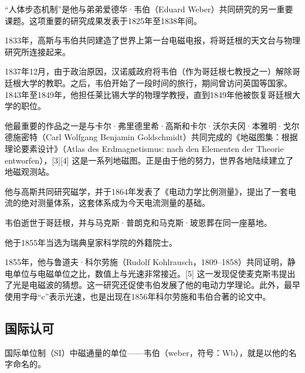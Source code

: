 “人体步态机制”是他与弟弟爱德华·韦伯（Eduard Weber）共同研究的另一重要课题。这项重要的研究成果发表于1825年至1838年间。  

1833年，高斯与韦伯共同建造了世界上第一台电磁电报，将哥廷根的天文台与物理研究所连接起来。

1837年12月，由于政治原因，汉诺威政府将韦伯（作为哥廷根七教授之一）解除哥廷根大学的教职。之后，韦伯开始了一段时间的旅行，期间曾访问英国等国家。1843年至1849年，他担任莱比锡大学的物理学教授，直到1849年他被恢复哥廷根大学的职位。  

他最重要的作品之一是与卡尔·弗里德里希·高斯和卡尔·沃尔夫冈·本雅明·戈尔德施密特（Carl Wolfgang Benjamin Goldschmidt）共同完成的《地磁图集：根据理论要素设计》（Atlas des Erdmagnetismus: nach den Elementen der Theorie entworfen），[3][4] 这是一系列地磁图。正是由于他的努力，世界各地陆续建立了地磁观测站。  

他与高斯共同研究磁学，并于1864年发表了《电动力学比例测量》，提出了一套电流的绝对测量体系，这套体系成为今天电流测量的基础。  

韦伯逝世于哥廷根，并与马克斯·普朗克和马克斯·玻恩葬在同一座墓地。

他于1855年当选为瑞典皇家科学院的外籍院士。

1855年，他与鲁道夫·科尔劳施（Rudolf Kohlrausch，1809–1858）共同证明，静电单位与电磁单位之比，数值上与光速非常接近。[5] 这一发现促使麦克斯韦提出了光是电磁波的猜想。这一研究还促使韦伯发展了他的电动力学理论。此外，最早使用字母“c”表示光速，也是出现在1856年科尔劳施和韦伯合著的论文中。
\subsection{国际认可}  
国际单位制（SI）中磁通量的单位——韦伯（weber，符号：Wb），就是以他的名字命名的。
